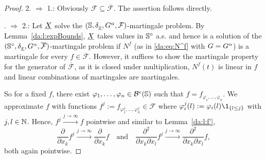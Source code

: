 \begin{proof}
2. $\Rightarrow$ 1.: Obviously $\mathcal{F} \subseteq \overline{\mathcal{F}}$. The assertion follows directly.

. $\Rightarrow$ 2.: Let $\underline{X}$ solve the
$(\mathbb{S},\delta_{\underline{x}},G^{\alpha},\mathcal{F})$-martingale problem. 
By Lemma~\ref{da:l:expBounds}, $\underline{X}$ takes values in $\mathbb{S}^\circ$ a.s. and hence is a solution of
the $(\mathbb{S}^\circ,\delta_{\underline{x}},G^{\alpha},\overline{\mathcal{F}})$-martingale
problem if $N^f$ (as in \eqref{da:eq:N^f} with $G = G^{\alpha}$) is a martingale for
every $f \in \overline{\mathcal{F}}$. However, it suffices to show the
martingale property for the generator of $\overline{\mathcal{F}}$, as it is
closed under multiplication, $N^f(t)$ is linear in $f$ and linear combinations
of martingales are martingales.

\noindent
So for a fixed $f$, there exist $\varphi_1,\ldots,\varphi_n \in
\mathcal{B}^{e}\!\left(\mathbb{S}\right)$ such that $f = f_{\varphi_1,\ldots,\varphi_n}$. We
approximate $f$ with functions $f^j := f_{\varphi^j_1,\ldots,\varphi^j_n} \in \mathcal{F}$ where $\varphi^j_i(l) :=
\varphi_i(l)\1_{\{l \leq j\}}$ with $j,l \in \mathbb{N}$. Hence, $f^j \xrightarrow{j\to\infty}
f$ pointwise and similar to Lemma~\ref{da:l:f'}, 
$$ \frac{\partial}{\partial x_k}f^j \xrightarrow{j\to\infty} \frac{\partial}{\partial x_k}f
\quad \text{and} \quad
\frac{\partial^2}{\partial x_k \partial x_l}f^j \xrightarrow{j\to\infty} 
\frac{\partial^2}{\partial x_k \partial x_l}f, $$
both again pointwise. 


\end{proof}
